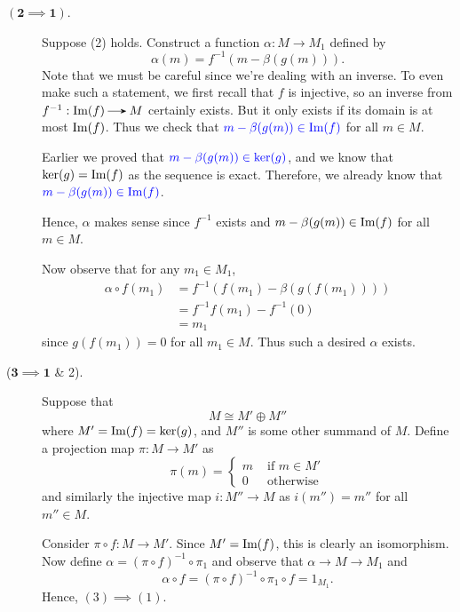 \begin{prf}
\begin{description}
        \item[$\bm{(2 \implies 1)}$.] Suppose (2) holds. Construct
        a function $\alpha : M \to M_1$ defined by 
        \[
            \alpha(m) = f^{-1}(m - \beta (g(m))).
        \]
        Note that we must be careful since we're dealing with an
        inverse. To even make such a statement, we first recall
        that $f$ is injective, so an inverse from $f^{-1}: \im(f) \to M$
        certainly exists. But it only exists if its domain is at
        most $\mbox{Im}(f)$. Thus we check that $\textcolor{blue}{m - \beta(g(m)) \in
        \mbox{Im}(f)}$ for all $m \in M$.
        
        Earlier we proved that $\textcolor{blue}{m -
        \beta(g(m)) \in \ker(g)}$, and we know that $\ker(g) =
        \mbox{Im}(f)$ as the sequence is exact.
        Therefore, we already know that $\textcolor{blue}{m -
        \beta(g(m)) \in \mbox{Im}(f)}$.

        Hence, $\alpha$ makes sense
        since $f^{-1}$ exists and $m - \beta(g(m)) \in \mbox{Im}(f)$ for
        all $m \in M$.


        Now observe that for any $m_1 \in M_1$, 
        \begin{align*}
            \alpha \circ f(m_1) &= f^{-1}(f(m_1) - \beta(g(f(m_1))))\\
            &= f^{-1}f(m_1) - f^{-1}(0)\\
            &= m_1
        \end{align*}
        since $g(f(m_1)) = 0$ for all $m_1 \in M$. Thus such a
        desired $\alpha$ exists.

        \item[($\bm{3 \implies 1}$ \& 2).]
        Suppose that 
        \[
            M \cong M'\oplus M''
        \] 
        where $M' = \mbox{Im}(f) = \ker(g)$, and $M''$ is some other
        summand of $M$. Define a projection map $\pi: M \to M'$ as
        \[
            \pi(m) =
            \begin{cases}
                m & \text{ if } m \in M'\\
                0 & \text{ otherwise}
            \end{cases}
        \]
        and similarly the injective map $i: M'' \to M$ as $i(m'')
        = m''$ for all $m'' \in M$. 
        
        Consider $\pi \circ f: M \to M'$. Since $M' = \mbox{Im}(f)$,
        this is clearly an isomorphism. Now define $\alpha = (\pi
        \circ f)^{-1} \circ \pi_1$ and observe that $\alpha
        \to M \to M_1$ and 
        \[
            \alpha \circ f = (\pi \circ f)^{-1} \circ \pi_1 \circ f = 1_{M_1}.
        \]
        Hence, $(3) \implies (1)$.
        

\end{description}
\end{prf}
